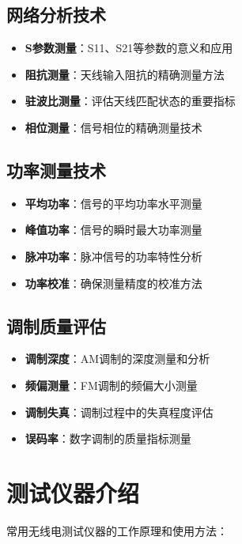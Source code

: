 \documentclass[12pt,UTF8]{ctexbook}
\begin{document}
\subsection{网络分析技术}

\begin{itemize}[leftmargin=3.5em]
    \item \textbf{S参数测量}：S11、S21等参数的意义和应用
    \item \textbf{阻抗测量}：天线输入阻抗的精确测量方法
    \item \textbf{驻波比测量}：评估天线匹配状态的重要指标
    \item \textbf{相位测量}：信号相位的精确测量技术
\end{itemize}

\subsection{功率测量技术}

\begin{itemize}[leftmargin=3.5em]
    \item \textbf{平均功率}：信号的平均功率水平测量
    \item \textbf{峰值功率}：信号的瞬时最大功率测量
    \item \textbf{脉冲功率}：脉冲信号的功率特性分析
    \item \textbf{功率校准}：确保测量精度的校准方法
\end{itemize}

\subsection{调制质量评估}

\begin{itemize}[leftmargin=3.5em]
    \item \textbf{调制深度}：AM调制的深度测量和分析
    \item \textbf{频偏测量}：FM调制的频偏大小测量
    \item \textbf{调制失真}：调制过程中的失真程度评估
    \item \textbf{误码率}：数字调制的质量指标测量
\end{itemize}

\section{测试仪器介绍}

常用无线电测试仪器的工作原理和使用方法：
\end{document}
